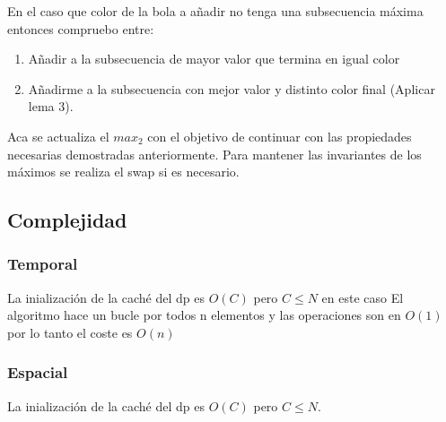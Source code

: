 \documentclass{article}
\begin{document}
 En el caso que color de la bola a añadir no tenga una subsecuencia máxima entonces compruebo entre:
 \begin{enumerate}
    \item Añadir a la subsecuencia de mayor valor que termina en igual color
    \item Añadirme a la subsecuencia con mejor valor y distinto color final (Aplicar lema 3).
 \end{enumerate}
 Aca se actualiza el $max_2$ con el objetivo de continuar con las propiedades necesarias demostradas anteriormente.
 Para mantener las invariantes de los máximos se realiza el swap si es necesario.

 \subsection{Complejidad}
\subsubsection{Temporal}
La inialización de la caché del dp es $O(C)$ pero $C \leq N$ en este caso
El algoritmo hace un bucle por todos n elementos y las operaciones son en $O(1)$ por lo tanto 
el coste es $O(n)$
\subsubsection{Espacial}
La inialización de la caché del dp es $O(C)$ pero $C \leq N$.
\end{document}
